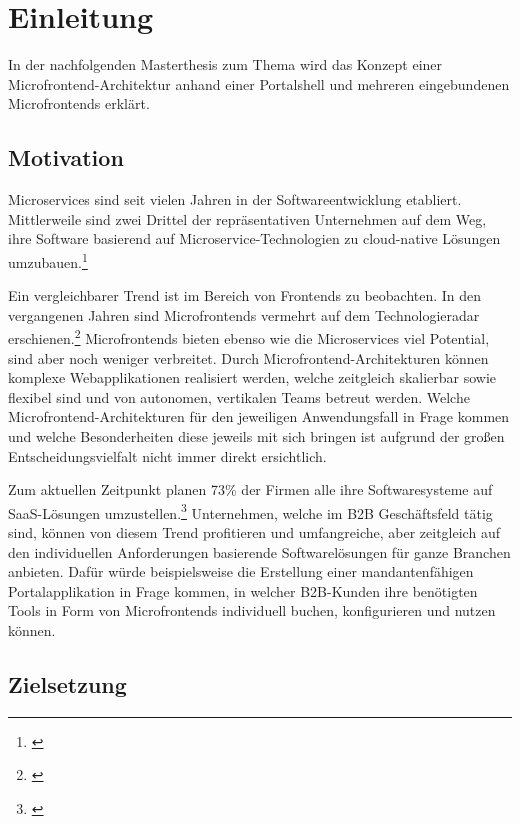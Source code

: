 \section{Einleitung}\label{ch:Einleitung}

In der nachfolgenden Masterthesis zum Thema \textit{\dokumententitel} wird das Konzept einer Microfrontend-Architektur anhand einer Portalshell und mehreren eingebundenen Microfrontends erklärt.

\subsection{Motivation}\label{sec:Aufgabenstellung}

Microservices sind seit vielen Jahren in der Softwareentwicklung etabliert. Mittlerweile sind zwei Drittel der repräsentativen Unternehmen auf dem Weg, ihre Software basierend auf Microservice-Technologien zu cloud-native Lösungen umzubauen.\footnote{\cite[vgl.][]{Lünendonk2021}}

Ein vergleichbarer Trend ist im Bereich von Frontends zu beobachten. In den vergangenen Jahren sind Microfrontends vermehrt auf dem Technologieradar erschienen.\footnote{\cite[vgl.][]{Thoughtworks2020}} Microfrontends bieten ebenso wie die Microservices viel Potential, sind aber noch weniger verbreitet. Durch Microfrontend-Architekturen können komplexe Webapplikationen realisiert werden, welche zeitgleich skalierbar sowie flexibel sind und von autonomen, vertikalen Teams betreut werden. Welche Microfrontend-Architekturen für den jeweiligen Anwendungsfall in Frage kommen und welche Besonderheiten diese jeweils mit sich bringen ist aufgrund der großen Entscheidungsvielfalt nicht immer direkt ersichtlich.

Zum aktuellen Zeitpunkt planen 73\% der Firmen alle ihre Softwaresysteme auf \gls{SaaS}-Lösungen umzustellen.\footnote{\cite[vgl.][]{Alves2021}} Unternehmen, welche im \gls{B2B} Geschäftsfeld tätig sind, können von diesem Trend profitieren und umfangreiche, aber zeitgleich auf den individuellen Anforderungen basierende Softwarelösungen für ganze Branchen anbieten.\newline
Dafür würde beispielsweise die Erstellung einer mandantenfähigen Portalapplikation in Frage kommen, in welcher \gls{B2B}-Kunden ihre benötigten Tools in Form von Microfrontends individuell buchen, konfigurieren und nutzen können.

\subsection{Zielsetzung}\label{sec:Zielsetzung}

